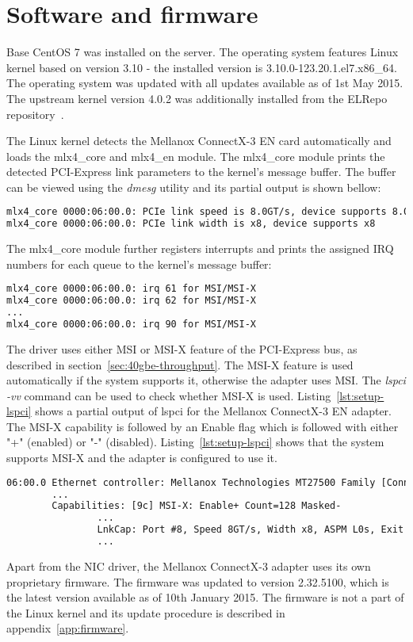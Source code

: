 
\section{Software and firmware}
Base CentOS 7 was installed on the server.
The operating system features Linux kernel based on version 3.10 -
the installed version is 3.10.0-123.20.1.el7.x86\_64.
The operating system was updated with all updates available as of 1st May 2015.
The upstream kernel version 4.0.2 was additionally installed from the ELRepo repository~\cite{elrepo-kernel-ml}.

The Linux kernel detects the Mellanox ConnectX-3 EN card automatically and loads the mlx4\_core and mlx4\_en module.
The mlx4\_core module prints the detected PCI-Express link parameters to the kernel's message buffer.
The buffer can be viewed using the {\it{dmesg}} utility and its partial output is shown bellow:
\begin{lstlisting}[language=TeX]
mlx4_core 0000:06:00.0: PCIe link speed is 8.0GT/s, device supports 8.0GT/s
mlx4_core 0000:06:00.0: PCIe link width is x8, device supports x8
\end{lstlisting}
The mlx4\_core module further registers interrupts and prints the assigned IRQ numbers for each queue
to the kernel's message buffer:
\begin{lstlisting}[language=TeX]
mlx4_core 0000:06:00.0: irq 61 for MSI/MSI-X
mlx4_core 0000:06:00.0: irq 62 for MSI/MSI-X
...
mlx4_core 0000:06:00.0: irq 90 for MSI/MSI-X
\end{lstlisting}

The driver uses either MSI or MSI-X feature of the PCI-Express bus, as described in section~\ref{sec:40gbe-throughput}.
The MSI-X feature is used automatically if the system supports it, otherwise the adapter uses MSI.
The {\it{lspci -vv}} command can be used to check whether MSI-X is used.
Listing~\ref{lst:setup-lspci} shows a partial output of lspci for the Mellanox ConnectX-3 EN adapter.
The MSI-X capability is followed by an Enable flag which is followed with either "+" (enabled)
or "-" (disabled).
Listing~\ref{lst:setup-lspci} shows that the system supports MSI-X and the adapter is configured to use it.
\begin{lstlisting}[language=TeX,label={lst:setup-lspci},caption={Partial output of lspci -vv for Mellanox ConnectX-3 EN}]
06:00.0 Ethernet controller: Mellanox Technologies MT27500 Family [ConnectX-3]
		...
		Capabilities: [9c] MSI-X: Enable+ Count=128 Masked-
				...
				LnkCap: Port #8, Speed 8GT/s, Width x8, ASPM L0s, Exit Latency L0s unlimited, L1 unlimited
				...
\end{lstlisting}

Apart from the NIC driver, the Mellanox ConnectX-3 adapter uses its own proprietary firmware.
The firmware was updated to version 2.32.5100, which is the latest version available as of 10th January 2015.
The firmware is not a part of the Linux kernel and its update procedure is described in appendix~\ref{app:firmware}.
